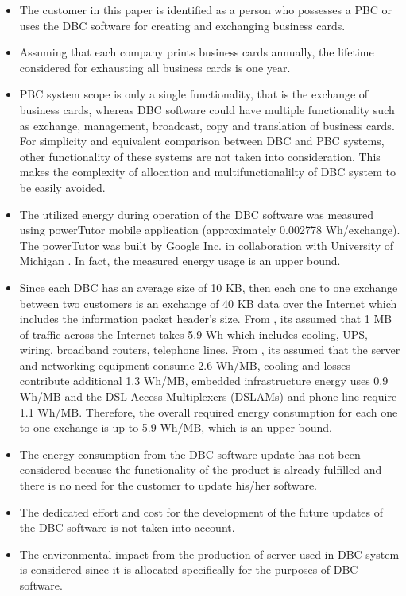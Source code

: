 \documentclass[3p,times,procedia]{elsarticle}
\begin{document}
\begin{itemize}[]
\item The customer in this paper is identified as a person who possesses a PBC or uses the DBC software for creating and exchanging business cards.
\item Assuming that each company prints business cards annually, the lifetime considered for exhausting all business cards is one year.
\item PBC system scope is only a single functionality, that is the exchange of business cards, whereas DBC software could have multiple functionality such as exchange, management, broadcast, copy and translation of business cards. For simplicity and equivalent comparison between DBC and PBC systems, other functionality of these systems are not taken into consideration. This makes the complexity of allocation and multifunctionalilty of DBC system to be easily avoided.
\item The utilized energy during operation of the DBC software was measured using powerTutor mobile application (approximately 0.002778 Wh/exchange). The powerTutor was built by Google Inc. in collaboration with University of Michigan \cite{zhang2010accurate}. In fact, the measured energy usage is an upper bound.
 \item Since each DBC has an average size of 10 KB, then each one to one exchange between two customers is an exchange of 40 KB data over the Internet which includes the information packet header's size. From \cite{Moshnyaga:2013}, its assumed that 1 MB of traffic across the Internet takes 5.9 Wh which includes cooling, UPS, wiring, broadband routers, telephone lines. From \cite{EnergyDownload}, its assumed that the server and networking equipment consume 2.6 Wh/MB, cooling and losses contribute additional 1.3 Wh/MB, embedded infrastructure energy uses 0.9 Wh/MB and the DSL Access Multiplexers (DSLAMs) and phone line require 1.1 Wh/MB. Therefore, the overall required energy consumption for each one to one exchange is up to 5.9 Wh/MB,  which is an upper bound.
\item The energy consumption from the DBC software update has not been considered because the functionality of the product is already fulfilled and there is no need for the customer to update his/her software.
\item The dedicated effort and cost for the development of the future updates of the DBC software is not taken into account.
\item The environmental impact from the production of server used in DBC system is considered since it is allocated specifically for the purposes of DBC software.

\end{itemize}
\end{document}
